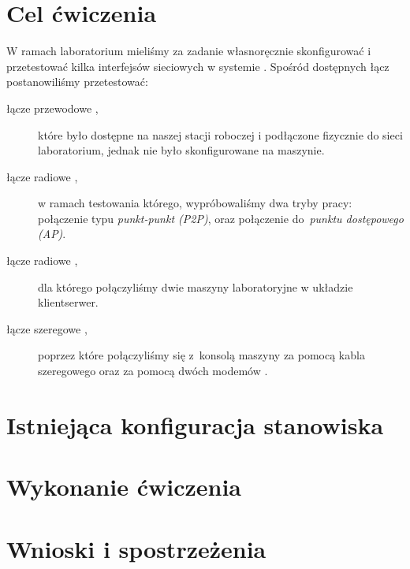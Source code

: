 \documentclass[a4paper,11pt,notitlepage]{article}
\begin{document}

\maketitle
\tableofcontents


\section{Cel ćwiczenia}

W ramach laboratorium mieliśmy za zadanie własnoręcznie skonfigurować i
przetestować kilka interfejsów sieciowych w systemie \bsd. Spośród dostępnych
łącz postanowiliśmy przetestować:

\begin{description}
    \item[łącze przewodowe \eth\textnormal{,}] które było dostępne na naszej
    stacji roboczej i podłączone fizycznie do sieci laboratorium, jednak nie
    było skonfigurowane na maszynie.
    \item[łącze radiowe \wifi\textnormal{,}] w ramach testowania którego,
    wypróbowaliśmy dwa tryby pracy: połączenie typu \emph{punkt-punkt (P2P)},
    oraz połączenie do~\emph{punktu dostępowego (AP)}.
    \item[łącze radiowe \bt\textnormal{,}] dla którego połączyliśmy dwie
    maszyny laboratoryjne w układzie klient\dywiz serwer.
    \item[łącze szeregowe \rs\textnormal{,}] poprzez które połączyliśmy się
    z~konsolą maszyny \zielone{} za pomocą kabla szeregowego oraz za pomocą
    dwóch modemów \bt.
\end{description}


\section{Istniejąca konfiguracja stanowiska}


\section{Wykonanie ćwiczenia}




\section{Wnioski i spostrzeżenia}
\end{document}
